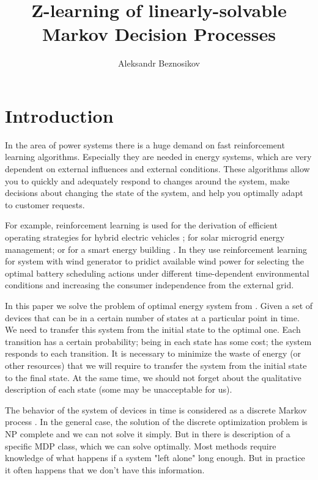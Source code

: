 \documentclass[12pt,twoside]{article}
\title
    [Z-learning of linearly-solvable Markov Decision Processes] %
    {Z-learning of linearly-solvable Markov Decision Processes}
\author
    [Aleksandr Beznosikov] %
    {Aleksandr Beznosikov} %
    [Aleksandr Beznosikov$^1$]
\begin{document}
\English
\maketitle

\section{Introduction} 

In the area of power systems there is a huge demand on fast reinforcement learning algorithms. Especially they are needed in energy systems, which are very dependent on external influences and external conditions. These algorithms allow you to quickly and adequately respond to changes around the system, make decisions about changing the state of the system, and help you optimally adapt to customer requests. 

For example, reinforcement learning is used for the derivation of efficient operating strategies for hybrid electric vehicles \cite{Liessner}; for solar microgrid energy management\cite{Raju}; or for a smart energy building \cite{Kim}. In \cite{Ruiz} they use reinforcement learning for system with wind generator to pridict available wind power for selecting the optimal battery scheduling actions under different time-dependent environmental conditions and increasing the consumer independence from the external grid. 

In this paper we solve the problem of optimal energy system from \cite{Chertkov}. Given a set of devices that can be in a certain number of states at a particular point in time. We need to transfer this system from the initial state to the optimal one. Each transition has a certain probability; being in each state has some cost; the system responds to each transition. It is necessary to minimize the waste of energy (or other resources) that we will require to transfer the system from the initial state to the final state. At the same time, we should not forget about the qualitative description of each state (some may be unacceptable for us).

The behavior of the system of devices in time is considered as a discrete Markov process \cite{Durrett}. In the general case, the solution of the discrete optimization problem is NP complete \cite{Korte} and we can not solve it simply. But in \cite{Todorov} there is description of a specific MDP class, which we can solve optimally. Most methods require knowledge of what happens if a system "left alone" long enough. But in practice it often happens that we don't have this information.
\end{document}
